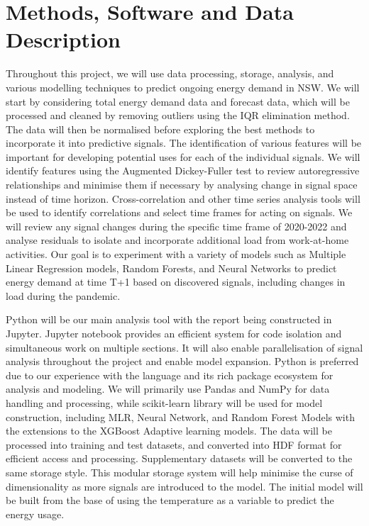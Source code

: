 \documentclass[mstat,12pt]{unswthesis}
\begin{document}
\hypertarget{methods-software-and-data-description}{%
\section{Methods, Software and Data
Description}\label{methods-software-and-data-description}}

Throughout this project, we will use data processing, storage, analysis, and various modelling techniques to predict ongoing energy demand in NSW. We will start by considering total energy demand data and forecast data, which will be processed and cleaned by removing outliers using the IQR elimination method. The data will then be normalised before exploring the best methods to incorporate it into predictive signals. The identification of various features will be important for developing potential uses for each of the individual signals. We will identify features using the Augmented Dickey-Fuller test to review autoregressive relationships and minimise them if necessary by analysing change in signal space instead of time horizon. Cross-correlation and other time series analysis tools will be used to identify correlations and select time frames for acting on signals. We will review any signal changes during the specific time frame of 2020-2022 and analyse residuals to isolate and incorporate additional load from work-at-home activities. Our goal is to experiment with a variety of models such as Multiple Linear Regression models, Random Forests, and Neural Networks to predict energy demand at time T+1 based on discovered signals, including changes in load during the pandemic.

\bigskip

Python will be our main analysis tool with the report being constructed in Jupyter. Jupyter notebook provides an efficient system for code isolation and simultaneous work on multiple sections. It will also enable parallelisation of signal analysis throughout the project and enable model expansion. Python is preferred due to our experience with the language and its rich package ecosystem for analysis and modeling. We will primarily use Pandas and NumPy for data handling and processing, while scikit-learn library will be used for model construction, including MLR, Neural Network, and Random Forest Models with the extensions to the XGBoost Adaptive learning models. The data will be processed into training and test datasets, and converted into HDF format for efficient access and processing. Supplementary datasets will be converted to the same storage style. This modular storage system will help minimise the curse of dimensionality as more signals are introduced to the model. The initial model will be built from the base of using the temperature as a variable to predict the energy usage.
\end{document}
